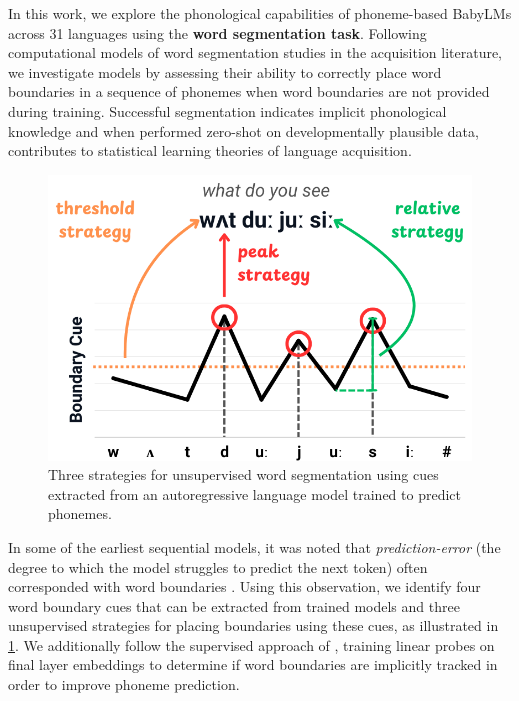
In this work, we explore the phonological capabilities of phoneme-based BabyLMs across 31 languages using the \textbf{word segmentation task}. Following computational models of word segmentation studies in the acquisition literature, we investigate models by assessing their ability to correctly place word boundaries in a sequence of phonemes when word boundaries are not provided during training. Successful segmentation indicates implicit phonological knowledge and when performed zero-shot on developmentally plausible data, contributes to statistical learning theories of language acquisition. 

\begin{figure}[t]
    \centering
    \includegraphics[width=0.95\linewidth]{Figures/15Phonology/overvieww.png}
    \caption{Three strategies for unsupervised word segmentation using cues extracted from an autoregressive language model trained to predict phonemes.}
    \label{fig:15-example}
\end{figure}

In some of the earliest sequential models, it was noted that \emph{prediction-error} (the degree to which the model struggles to predict the next token) often corresponded with word boundaries \citep{elman-1990-finding}. Using this observation,
we identify four word boundary cues that can be extracted from trained models and three unsupervised strategies for placing boundaries using these cues, as illustrated in \cref{fig:15-example}. We additionally follow the supervised approach of \citet{hahn-baroni-2019-tabula}, training linear probes on final layer embeddings to determine if word boundaries are implicitly tracked in order to improve phoneme prediction.

